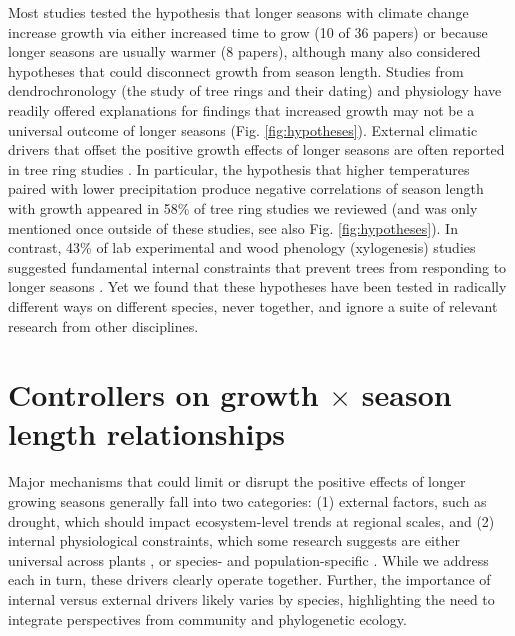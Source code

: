 \documentclass[11pt]{article}
\newcommand{\R}[1]{\label{#1}\linelabel{#1}}
\begin{document}
Most studies tested the hypothesis that longer seasons with climate change increase growth via either increased time to grow (10 of 36 papers) or because longer seasons are usually warmer (8 papers), although many also considered hypotheses that could disconnect growth from season length. Studies from dendrochronology (the study of tree rings and their dating) and physiology have readily offered explanations for findings that increased growth may not be a universal outcome of longer seasons (Fig. \ref{fig:hypotheses}). External climatic drivers that offset the positive growth effects of longer seasons are often reported in tree ring studies \citep{kolavr2016response,de2022temperature,camarero2022decoupled}. In particular, the hypothesis that higher temperatures paired with lower precipitation produce negative correlations of season length with growth appeared in 58\% of tree ring studies we reviewed (and was only mentioned once outside of these studies, see also Fig. \ref{fig:hypotheses}). In contrast, 43\% of lab experimental and wood phenology (xylogenesis) studies suggested fundamental internal constraints that prevent trees from responding to longer seasons \citep[Fig. \ref{fig:heatmapssupp},][]{cuny2012life,michelot2012comparing,zohner2023effect}. Yet we found that these hypotheses have been tested in radically different ways on different species, never together, and ignore a suite of relevant research from other disciplines. %
 
\section*{Controllers on growth $\times$ season length relationships}

Major mechanisms that could limit or disrupt the positive effects of longer growing seasons generally fall into two categories: (1) external factors, such as drought, which should impact ecosystem-level trends at regional scales, and (2) internal physiological constraints, which some research suggests are either universal across plants \citep[e.g.][]{zohner2023effect}, or species- and population-specific \citep[e.g.][]{soolanayakanahally2013timing}. \R{R2complaint1nonmutexcl}While we address each in turn, these drivers clearly operate together. Further, the importance of internal versus external drivers likely varies by species, highlighting the need to integrate perspectives from community and phylogenetic ecology. 
\end{document}
